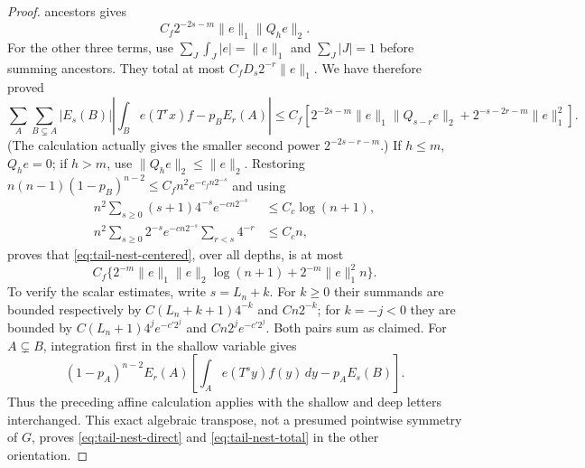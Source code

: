 \documentclass[11pt]{article}
\numberwithin{equation}{section}
\newcommand{\1}{\mathbf 1}\newcommand{\F}{\mathcal F}\newcommand{\D}{\mathcal D}
\newcommand{\norm}[1]{\lVert#1\rVert}
\begin{document}
\begin{proof}
ancestors gives
\[
 C_f2^{-2s-m}\norm e_1\norm{Q_he}_2.
\]
For the other three terms, use
$\sum_J\int_J|e|=\norm e_1$ and $\sum_J|J|=1$ before summing ancestors.
They total at most $C_fD_s2^{-r}\norm e_1$.  We have therefore proved
\begin{equation}\label{eq:tail-haar-full}
 \sum_A\sum_{B\subsetneq A}|E_s(B)|
 \left|\int_Be(T^rx)f-p_BE_r(A)\right|
 \le C_f\left[2^{-2s-m}\norm e_1\norm{Q_{s-r}e}_2
       +2^{-s-2r-m}\norm e_1^2\right].
\end{equation}
(The calculation actually gives the smaller second power
$2^{-2s-r-m}$.)  If $h\le m$, $Q_he=0$; if $h>m$, use
$\norm{Q_he}_2\le\norm e_2$.  Restoring
$n(n-1)(1-p_B)^{n-2}\le C_fn^2e^{-c_fn2^{-s}}$ and using
\begin{align}
 n^2\sum_{s\ge0}(s+1)4^{-s}e^{-cn2^{-s}}&\le C_c\log(n+1), \label{eq:tail-occ1}\\
 n^2\sum_{s\ge0}2^{-s}e^{-cn2^{-s}}\sum_{r<s}4^{-r}&\le C_cn, \label{eq:tail-occ2}
\end{align}
proves that \eqref{eq:tail-nest-centered}, over all depths, is at most
\begin{equation}\label{eq:tail-nest-total}
 C_f\{2^{-m}\norm e_1\norm e_2\log(n+1)
             +2^{-m}\norm e_1^2n\}.
\end{equation}
To verify the scalar estimates, write $s=L_n+k$.  For $k\ge0$ their
summands are bounded respectively by
$C(L_n+k+1)4^{-k}$ and $Cn2^{-k}$; for $k=-j<0$ they are bounded by
$C(L_n+1)4^je^{-c'2^j}$ and $Cn2^je^{-c'2^j}$.  Both pairs sum as claimed.
For $A\subsetneq B$, integration first in the shallow variable gives
\[
 (1-p_A)^{n-2}E_r(A)
 \left[\int_Ae(T^sy)f(y)\,dy-p_AE_s(B)\right].
\]
Thus the preceding affine calculation applies with the shallow and deep
letters interchanged.  This exact algebraic transpose, not a presumed
pointwise symmetry of $G$, proves \eqref{eq:tail-nest-direct} and
\eqref{eq:tail-nest-total} in the other orientation.


\end{proof}
\end{document}
